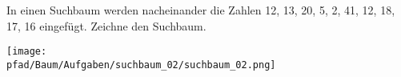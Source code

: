 \question[3]
In einen Suchbaum werden nacheinander die Zahlen
12, 13, 20, 5, 2, 41, 12, 18, 17, 16
eingefügt. Zeichne den Suchbaum.

\begin{solutionbox}{7cm}

\texttt{[image: \\pfad/Baum/Aufgaben/suchbaum\_02/suchbaum\_02.png]}
\end{solutionbox}
